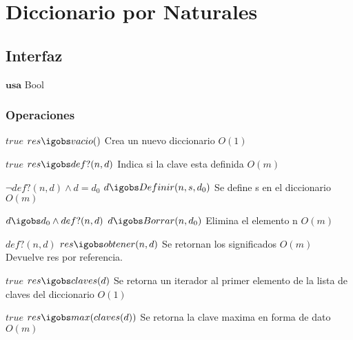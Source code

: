 
\section{Diccionario por Naturales}

\subsection{Interfaz}

$\textbf{usa}$ Bool


\subsubsection*{Operaciones}


 {$true$}
 {$res \igobs vacio()$}
 {Crea un nuevo diccionario}
 {$O(1)$}
 {}
 
  {$true$}
  {$res \igobs def?(n,d)$}
  {Indica si la clave esta definida}
  {$O(m)$}
  {}

  {$\neg def?(n,d) \land d=d_0$}
  {$d \igobs Definir(n, s, d_0)$}
  {Se define s en el diccionario}
  {$O(m)$}
  {}

 {$d \igobs d_0 \land def?(n,d)$}
 {$d \igobs Borrar(n,d_0)$}
 {Elimina el elemento n}
 {$O(m)$}
 {}

 {$def?(n,d)$}
 {$res \igobs obtener(n,d)$}
 {Se retornan los significados}
 {$O(m)$}
 {Devuelve res por referencia.}

 {$true$}
 {$res \igobs claves(d)$}
 {Se retorna un iterador al primer elemento de la lista de claves del diccionario}
 {$O(1)$}
 {}
 
 {$true$}
 {$res \igobs max(claves(d))$}
 {Se retorna la clave maxima en forma de dato}
 {$O(m)$}
 {}
 
